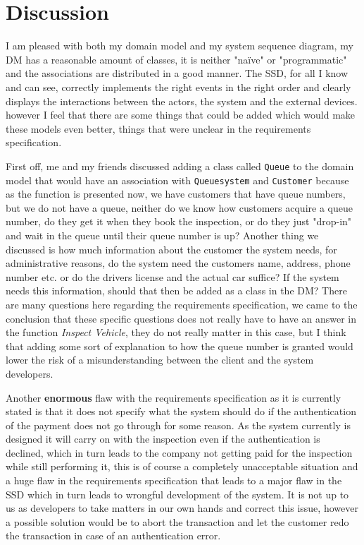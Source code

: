 \documentclass[a4paper]{scrreprt}
\begin{document}
\chapter{Discussion}

I am pleased with both my domain model and my system sequence diagram, my DM has a reasonable amount of classes, it is neither "naïve" or "programmatic" and the associations are distributed in a good manner. The SSD, for all I know and can see, correctly implements the right events in the right order and clearly displays the interactions between the actors, the system and the external devices. however I feel that there are some things that could be added which would make these models even better, things that were unclear in the requirements specification.

First off, me and my friends discussed adding a class called \texttt{Queue} to the domain model that would have an association with \texttt{Queuesystem} and \texttt{Customer} because as the function is presented now, we have customers that have queue numbers, but we do not have a queue, neither do we know how customers acquire a queue number, do they get it when they book the inspection, or do they just "drop-in" and wait in the queue until their queue number is up? Another thing we discussed is how much information about the customer the system needs, for administrative reasons, do the system need the customers name, address, phone number etc. or do the drivers license and the actual car suffice? If the system needs this information, should that then be added as a class in the DM? There are many questions here regarding the requirements specification, we came to the conclusion that these specific questions does not really have to have an answer in the function \textit{Inspect Vehicle}, they do not really matter in this case, but I think that adding some sort of explanation to how the queue number is granted would lower the risk of a misunderstanding between the client and the system developers.

Another \textbf{enormous} flaw with the requirements specification as it is currently stated is that it does not specify what the system should do if the authentication of the payment does not go through for some reason. As the system currently is designed it will carry on with the inspection even if the authentication is declined, which in turn leads to the company not getting paid for the inspection while still performing it, this is of course a completely unacceptable situation and a huge flaw in the requirements specification that leads to a major flaw in the SSD which in turn leads to wrongful development of the system. It is not up to us as developers to take matters in our own hands and correct this issue, however a possible solution would be to abort the transaction and let the customer redo the transaction in case of an authentication error.
\end{document}
